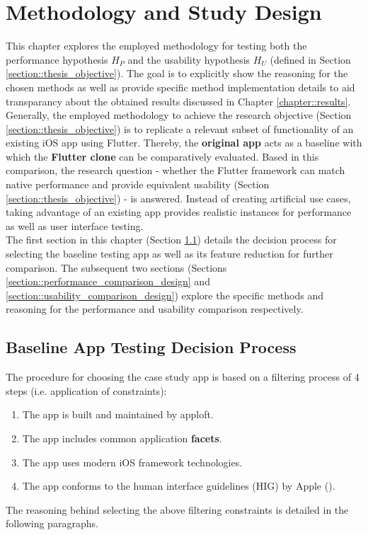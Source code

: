 \chapter{Methodology and Study Design} \label{chapter::study_design}
This chapter explores the employed methodology for testing both the performance hypothesis $H_P$ and the usability hypothesis $H_U$ (defined in Section \ref{section::thesis_objective}). 
The goal is to explicitly show the reasoning for the chosen methods as well as provide specific method implementation details to aid transparancy about the obtained results discussed in Chapter \ref{chapter::results}.\\
Generally, the employed methodology to achieve the research objective (Section \ref{section::thesis_objective}) is to replicate a relevant subset of functionality of an existing iOS app using Flutter. Thereby, the \textbf{original app} acts as a baseline with which the \textbf{Flutter clone} 
can be comparatively evaluated. Based in this comparison, the research question - whether the Flutter framework can match native performance and provide equivalent usability (Section \ref{section::thesis_objective}) - is answered.
Instead of creating artificial use cases, taking advantage of an existing app provides realistic instances for performance as well as user interface testing.\\
The first section in this chapter (Section \ref{section::facet_selection}) details the decision process for selecting the baseline testing app as well as its feature reduction for further comparison. 
The subsequent two sections (Sections \ref{section::performance_comparison_design} and \ref{section::usability_comparison_design}) explore the specific methods and reasoning for the performance and 
usability comparison respectively.




\section{Baseline App Testing Decision Process} \label{section::facet_selection}
The procedure for choosing the case study app is based on a filtering process of 4 steps (i.e. application of constraints):
\begin{enumerate}
    \item The app is built and maintained by apploft. \label{item::constraint_one}
    \item The app includes common application \textbf{facets}. \label{item::constraint_two}
    \item The app uses modern iOS framework technologies. \label{item::constraint_three}
    \item The app conforms to the human interface guidelines (HIG) by Apple (\cite{Apple2021a}). \label{item::constraint_four}
\end{enumerate}
The reasoning behind selecting the above filtering constraints is detailed in the following paragraphs.

